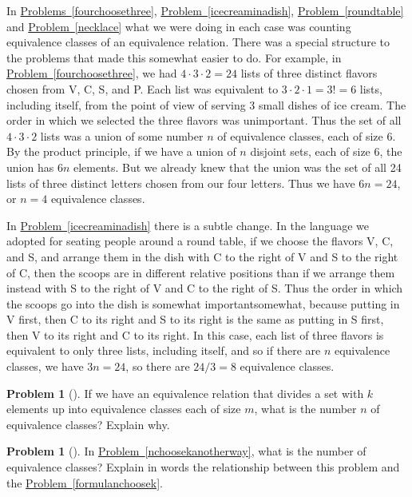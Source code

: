 \documentclass[10pt,]{book}
\theoremstyle{plain}
\theoremstyle{definition}
\newtheorem{activity}[project]{Problem}
\theoremstyle{definition}
\numberwithin{equation}{chapter}
\begin{document}
\hypertarget{p-1963}{}%
In \hyperref[fourchoosethree]{Problems~\ref{fourchoosethree}}, \hyperref[icecreaminadish]{Problem~\ref{icecreaminadish}}, \hyperref[roundtable]{Problem~\ref{roundtable}} and \hyperref[necklace]{Problem~\ref{necklace}} what we were doing in each case was counting equivalence classes of an equivalence relation. There was a special structure to the problems that made this somewhat easier to do. For example, in \hyperref[fourchoosethree]{Problem~\ref{fourchoosethree}}, we had \(4\cdot3\cdot2 =24\) lists of three distinct flavors chosen from V, C, S, and P. Each list was equivalent to \(3\cdot2\cdot1=3!=6\) lists, including itself, from the point of view of serving 3 small dishes of ice cream. The order in which we selected the three flavors was unimportant. Thus the set of all \(4\cdot3\cdot2\) lists was a union of some number \(n\) of equivalence classes, each of size 6. By the product principle, if we have a union of \(n\) disjoint sets, each of size 6, the union has \(6n\) elements. But we already knew that the union was the set of all 24 lists of three distinct letters chosen from our four letters. Thus we have \(6n=24\), or \(n=4\) equivalence classes.%
\par
\hypertarget{p-1964}{}%
In \hyperref[icecreaminadish]{Problem~\ref{icecreaminadish}} there is a subtle change. In the language we adopted for seating people around a round table, if we choose the flavors V, C, and S, and arrange them in the dish with C to the right of V and S to the right of C, then the scoops are in different relative positions than if we arrange them instead with S to the right of V and C to the right of S. Thus the order in which the scoops go into the dish is somewhat important\textemdash{}somewhat, because putting in V first, then C to its right and S to its right is the same as putting in S first, then V to its right and C to its right. In this case, each list of three flavors is equivalent to only three lists, including itself, and so if there are \(n\) equivalence classes, we have \(3n=24\), so there are \(24/3=8\) equivalence classes.%
\begin{activity}[]\marginsymbol[-1em]{} \label{EquivPrincipleProblem}
\hypertarget{p-1965}{}%
If we have an equivalence relation that divides a set with \(k\) elements up into equivalence classes each of size \(m\), what is the number \(n\) of equivalence classes? Explain why.%
\end{activity}
\begin{activity}[]\marginsymbol[-1em]{} \label{activity-357}
\hypertarget{p-1967}{}%
In \hyperref[nchoosekanotherway]{Problem~\ref{nchoosekanotherway}}, what is the number of equivalence classes? Explain in words the relationship between this problem and the \hyperref[formulanchoosek]{Problem~\ref{formulanchoosek}}.%
\end{activity}
\end{document}

